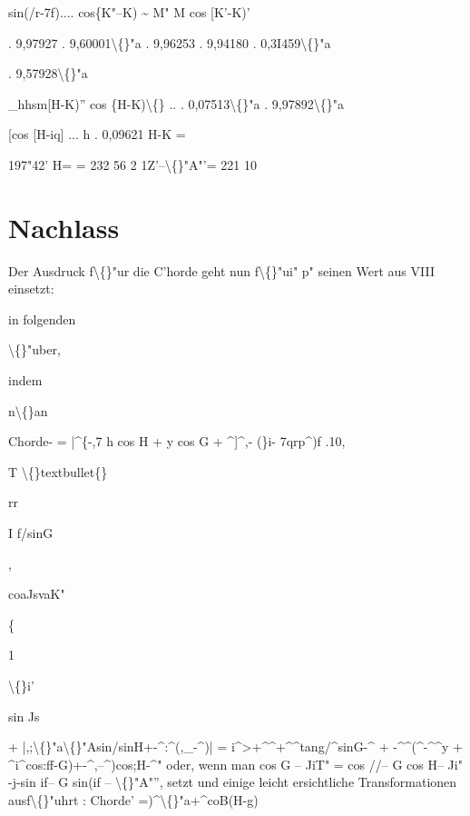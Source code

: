 \documentclass[10pt,a4paper]{article}
\begin{document}
sin(/r-7f)....
cos\{K"--K)
\textasciitilde{} M"
M cos [K'-K)'

. 9,97927
. 9,60001\textbackslash\{\}"a
. 9,96253
. 9,94180
. 0,3I459\textbackslash\{\}"a

. 9,57928\textbackslash\{\}"a

\_hhsm[H-K)''
cos \{H-K)\textbackslash\{\} .. . 0,07513\textbackslash\{\}"a
. 9,97892\textbackslash\{\}"a

[cos [H-iq] ...
h
. 0,09621
H-K =

197"42'
H= = 232
56 2
1Z'--\textbackslash\{\}"A"'= 221
10

\newpage

\section*{Nachlass}

Der Ausdruck f\textbackslash\{\}"ur die C'horde geht nun
f\textbackslash\{\}"ui" p" seinen Wert aus VIII einsetzt:

in folgenden

\textbackslash\{\}"uber,

indem

n\textbackslash\{\}an

Chorde- = |\textasciicircum{}\{-,7 h cos H + y cos G + \textasciicircum{}]\textasciicircum{},- (\}i- 7qrp\textasciicircum{})f
.10,

T \textbackslash\{\}textbullet\{\}

rr

I f/sinG

,

coaJsvaK"

\{

1

\textbackslash\{\}i'

sin Js

+ |,;\textbackslash\{\}"a\textbackslash\{\}"Asin/sinH+-\textasciicircum{}:\textasciicircum{}(,\_-\textasciicircum{})|
= i\textasciicircum{}>+\textasciicircum{}\textasciicircum{}+\textasciicircum{}\textasciicircum{}tang/\textasciicircum{}sinG-\textasciicircum{} + -\textasciicircum{}\textasciicircum{}(\textasciicircum{}-\textasciicircum{}\textasciicircum{}y
+ \textasciicircum{}i\textasciicircum{}cos:ff-G)+-\textasciicircum{},--\textasciicircum{})cos;H-\textasciicircum{}"
oder, wenn man cos G -- JiT" = cos //-- G cos H-- Ji" -j-sin if-- G sin(if -- \textbackslash\{\}"A"'',
setzt und einige leicht ersichtliche Transformationen ausf\textbackslash\{\}"uhrt :
Chorde' =)\textasciicircum{}\textbackslash\{\}"a+\textasciicircum{}coB(H-g)
\end{document}

